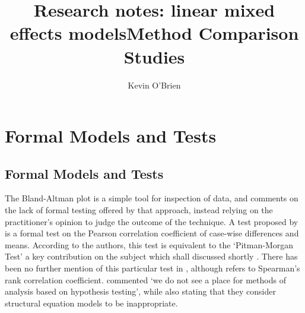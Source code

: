 \documentclass[12pt, a4paper]{report}
\title{Research notes: linear mixed effects models}
\author{ } \date{ }
\theoremstyle{plain}
\theoremstyle{definition}
\theoremstyle{remark}
\begin{document}
	\author{Kevin O'Brien}
	\title{Method Comparison Studies}
	
	
	\tableofcontents
	
	
	
	
\chapter{Formal Models and Tests}


\section{Formal Models and Tests}
The Bland-Altman plot is a simple tool for inspection of data, and
\citet{Kinsella} comments on the lack of formal testing offered by
that approach, instead relying on the practitioner's opinion to judge the outcome of the technique. A test proposed by \citet{BA83} is a formal test on the
Pearson correlation coefficient of case-wise differences and means. According to the authors, this test is equivalent
to the `Pitman-Morgan Test' a key contribution on the subject which shall discussed shortly \citep{ morgan, pitman}. There has been no further mention of this particular test in
\citet{BA86}, although \citet{BA99} refers to Spearman's rank
correlation coefficient. \citet{BA99} commented `we do not see a
place for methods of analysis based on hypothesis testing', while also stating that they consider structural equation models to be inappropriate.
\end{document}
